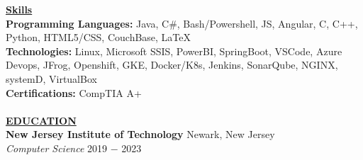 \documentclass{article}
\begin{document}
\noindent \textbf{\underline{Skills}} \\
\noindent \textbf{Programming Languages: } Java, C\#, Bash/Powershell, JS, Angular, C, C++, Python, HTML5/CSS, CouchBase, \LaTeX\\
\noindent \textbf{Technologies: } Linux, Microsoft SSIS, PowerBI, SpringBoot, VSCode, Azure Devops, JFrog, Openshift, GKE, Docker/K8s, Jenkins, SonarQube, NGINX, systemD, VirtualBox\\
\noindent \textbf{Certifications: } CompTIA A+\\ \\
\noindent \textbf{\underline{EDUCATION}} \\
\textbf{New Jersey Institute of Technology} \hfill Newark, New Jersey \\
\textit{Computer Science}  \hfill \hfill 2019 $-$ 2023 \\
\end{document}
